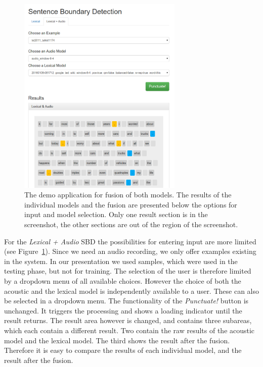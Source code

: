 \begin{figure}[ht]
    \centering
    \includegraphics[width=0.7\textwidth]{img/demo_l_a.png}
    \caption{The demo application for fusion of both models. The results of the individual models and the fusion are presented below the options for input and model selection. Only one result section is in the screenshot, the other sections are out of the region of the screenshot.}
    \label{fig:demo_la}
\end{figure}

For the \emph{Lexical + Audio} SBD the possibilities for entering input are more limited (see Figure~\ref{fig:demo_la}).
Since we need an audio recording, we only offer examples existing in the system.
In our presentation we used samples, which were used in the testing phase, but not for training.
The selection of the user is therefore limited by a dropdown menu of all available choices.
However the choice of both the acoustic and the lexical model is independently available to a user.
These can also be selected in a dropdown menu.
The functionality of the \emph{Punctuate!} button is unchanged.
It triggers the processing and shows a loading indicator until the result returns.
The result area however is changed, and contains three subareas, which each contain a different result.
Two contain the raw results of the acoustic model and the lexical model.
The third shows the result after the fusion.
Therefore it is easy to compare the results of each individual model, and the result after the fusion.
